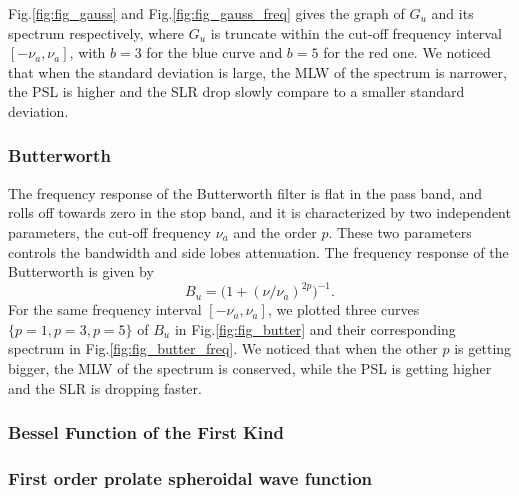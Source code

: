 \documentclass[useAMS,usenatbib]{mn2e}
\begin{document}
Fig.\ref{fig:fig_gauss} and Fig.\ref{fig:fig_gauss_freq} gives the graph of $G_{u}$ and its spectrum respectively, where $G_{u}$ 
is truncate within the cut-off frequency interval $[-\nu_a,\nu_a]$, with $b = 3$ for the blue curve and $b=5$ for the red one. We noticed 
that when the standard deviation is large, the MLW of the spectrum is narrower, the PSL is higher and the SLR drop slowly compare to a 
smaller standard deviation.
\subsubsection{Butterworth}
The frequency response of the Butterworth filter is flat  in the pass band, and rolls off towards zero in the stop band, and it is 
characterized by two independent parameters, the cut-off frequency 
$\nu_a$ and the order $p$. These two parameters controls the 
bandwidth and side lobes  attenuation. The frequency response of the Butterworth is given by 
\begin{equation}
B_u= \Big(1 + (\nu/\nu_a)^{2p}\Big)^{-1}.
\end{equation}
For the same frequency interval $[-\nu_a,\nu_a]$, we plotted  three curves $\{p=1, p=3, p=5\}$ of $B_{u}$ in Fig.\ref{fig:fig_butter} and 
their corresponding spectrum in Fig.\ref{fig:fig_butter_freq}.  We noticed 
that when the other $p$ is getting bigger, the MLW of the spectrum is conserved, while the PSL is getting higher and the SLR is 
dropping  faster.
\subsubsection{Bessel Function of the First Kind}
\subsubsection{First order prolate spheroidal wave function}
\end{document}
